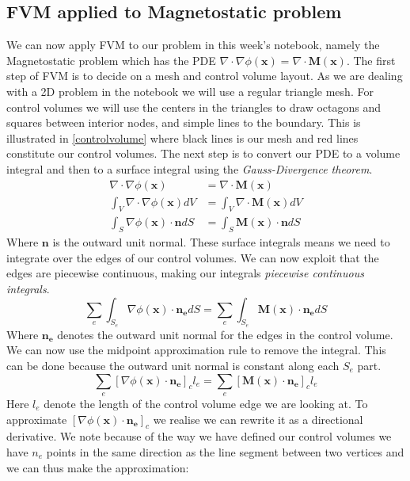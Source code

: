 \subsection{FVM applied to Magnetostatic problem}
We can now apply FVM to our problem in this week's notebook, namely the Magnetostatic problem which has the PDE $\nabla \cdot \nabla \phi(\mathbf{x}) = \nabla \cdot \mathbf{M}(\mathbf{x})$. The first step of FVM is to decide on a mesh and control volume layout. As we are dealing with a 2D problem in the notebook we will use a regular triangle mesh. For control volumes we will use the centers in the triangles to draw octagons and squares between interior nodes, and simple lines to the boundary. This is illustrated in \autoref{controlvolume} where black lines is our mesh and red lines constitute our control volumes. The next step is to convert our PDE to a volume integral and then to a surface integral using the \textit{Gauss-Divergence theorem}.
\begin{align*}
	\nabla \cdot \nabla \phi(\mathbf{x}) &= \nabla \cdot \mathbf{M}(\mathbf{x})\\
	\int_V\nabla \cdot \nabla \phi(\mathbf{x})dV &= \int_V \nabla \cdot \mathbf{M}(\mathbf{x})dV\\
	\int_S\nabla \phi(\mathbf{x})\cdot \mathbf{n}dS &= \int_S \mathbf{M}(\mathbf{x})\cdot \mathbf{n}dS
\end{align*}
Where $\mathbf{n}$ is the outward unit normal. These surface integrals means we need to integrate over the edges of our control volumes. We can now exploit that the edges are piecewise continuous, making our integrals \textit{piecewise continuous integrals}. 
\begin{equation*}
	\sum_e\int_{S_e}\nabla \phi(\mathbf{x})\cdot \mathbf{n_e}dS = \sum_e\int_{S_e} \mathbf{M}(\mathbf{x})\cdot \mathbf{n_e}dS
\end{equation*}
Where $\mathbf{n_e}$ denotes the outward unit normal for the edges in the control volume. We can now use the midpoint approximation rule to remove the integral. This can be done because the outward unit normal is constant along each $S_e$ part. 
\begin{equation*}
		\sum_e[\nabla \phi(\mathbf{x})\cdot \mathbf{n_e}]_cl_e = \sum_e [\mathbf{M}(\mathbf{x})\cdot \mathbf{n_e}]_cl_e
\end{equation*}
Here $l_e$ denote the length of the control volume edge we are looking at. To approximate $[\nabla \phi(\mathbf{x})\cdot \mathbf{n_e}]_c$ we realise we can rewrite it as a directional derivative. We note because of the way we have defined our control volumes we have $n_e$ points in the same direction as the line segment between two vertices and we can thus make the approximation:
